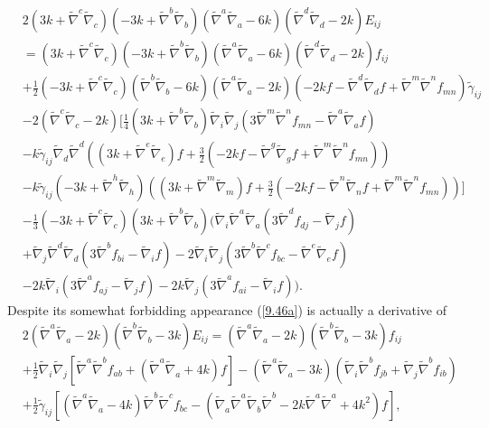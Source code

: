 \documentclass[aps,onecolumn,10pt]{revtex4}
\numberwithin{equation}{section}
\numberwithin{equation}{section}
\begin{document}
%
\begin{align}
&2(3k+\tilde{\nabla}^c\tilde{\nabla}_c)(-3k+\tilde{\nabla}^b\tilde{\nabla}_b)(\tilde{\nabla}^a\tilde{\nabla}_a-6k)(\tilde{\nabla}^d\tilde{\nabla}_d-2k)E_{ij}
\nonumber
\\
&=(3k+\tilde{\nabla}^c\tilde{\nabla}_c)(-3k+\tilde{\nabla}^b\tilde{\nabla}_b)(\tilde{\nabla}^a\tilde{\nabla}_a-6k)(\tilde{\nabla}^d\tilde{\nabla}_d-2k)f_{ij}
\nonumber
\\
&+\frac{1}{2}(-3k+\tilde{\nabla}^c\tilde{\nabla}_c)(\tilde{\nabla}^b\tilde{\nabla}_b-6k)(\tilde{\nabla}^a\tilde{\nabla}_a-2k)(-2kf-\tilde{\nabla}^d\tilde{\nabla}_df+\tilde{\nabla}^m\tilde{\nabla}^nf_{mn}) \tilde{\gamma}_{ij}
\nonumber
\\
&-2(\tilde{\nabla}^c\tilde{\nabla}_c-2k)\Bigg[\frac{1}{4}(3k+\tilde{\nabla}^b\tilde{\nabla}_b)\tilde{\nabla}_i\tilde{\nabla}_j\left(3\tilde{\nabla}^m\tilde{\nabla}^nf_{mn}-\tilde{\nabla}^a\tilde{\nabla}_af\right)
\nonumber
\\
&-k\tilde{\gamma}_{ij}\tilde{\nabla}_d\tilde{\nabla}^d((3k+\tilde{\nabla}^e\tilde{\nabla}_e)f+\frac{3}{2}(-2kf-\tilde{\nabla}^g\tilde{\nabla}_gf+\tilde{\nabla}^m\tilde{\nabla}^nf_{mn}))
\nonumber
\\
&-k\tilde{\gamma}_{ij}(-3k+\tilde{\nabla}^h\tilde{\nabla}_h)((3k+\tilde{\nabla}^m\tilde{\nabla}_m)f+\frac{3}{2}(-2kf-\tilde{\nabla}^n\tilde{\nabla}_nf+\tilde{\nabla}^m\tilde{\nabla}^nf_{mn}))\Bigg]
\nonumber
\\
&-\frac{1}{3}(-3k+\tilde{\nabla}^c\tilde{\nabla}_c)(3k+\tilde{\nabla}^b\tilde{\nabla}_b)\Bigg(\tilde{\nabla}_i\tilde{\nabla}^a\tilde{\nabla}_a(3\tilde{\nabla}^df_{dj}-\tilde{\nabla}_jf)
\nonumber
\\
&+\tilde{\nabla}_j\tilde{\nabla}^d\tilde{\nabla}_d(3\tilde{\nabla}^bf_{bi}-\tilde{\nabla}_if)-2\tilde{\nabla}_i\tilde{\nabla}_j(3\tilde{\nabla}^b\tilde{\nabla}^cf_{bc}-\tilde{\nabla}^e\tilde{\nabla}_ef)
\nonumber
\\
&-2k\tilde{\nabla}_i(3\tilde{\nabla}^af_{aj}-\tilde{\nabla}_jf)-2k\tilde{\nabla}_j(3\tilde{\nabla}^af_{ai}-\tilde{\nabla}_if)\Bigg).
\label{9.46a}
\end{align}
%
Despite its somewhat forbidding appearance (\ref{9.46a}) is actually a derivative of 
%
\begin{align}
&2(\tilde{\nabla}^a\tilde{\nabla}_a-2k)(\tilde{\nabla}^b\tilde{\nabla}_b-3k)E_{ij}
=(\tilde{\nabla}^a\tilde{\nabla}_a-2k)(\tilde{\nabla}^b\tilde{\nabla}_b-3k)f_{ij}
\nonumber\\
&+\tfrac{1}{2}\tilde{\nabla}_i\tilde{\nabla}_j\left[\tilde{\nabla}^a\tilde{\nabla}^bf_{ab}+(\tilde{\nabla}^a\tilde{\nabla}_a+4k)f\right]-(\tilde{\nabla}^a\tilde{\nabla}_a-3k)(\tilde{\nabla}_i\tilde{\nabla}^bf_{jb}+\tilde{\nabla}_j\tilde{\nabla}^bf_{ib})
\nonumber\\
&+\tfrac{1}{2}\tilde{\gamma}_{ij}\left[(\tilde{\nabla}^a\tilde{\nabla}_a-4k)\tilde{\nabla}^b\tilde{\nabla}^cf_{bc}
-(\tilde{\nabla}_a\tilde{\nabla}^a\tilde{\nabla}_b\tilde{\nabla}^b-2k\tilde{\nabla}^a\tilde{\nabla}^a+4k^2)f\right],
\label{9.47a}
\end{align}
\end{document}
